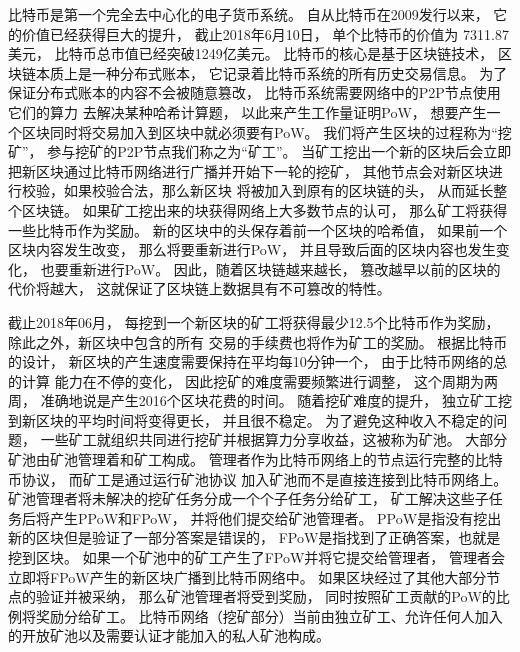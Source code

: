 \documentclass[a4paper, 11pt]{article}
\begin{document}
\begin{CJK*}{UTF8}{gbsn}
    比特币\cite{ref_article1}是第一个完全去中心化的电子货币系统。
    自从比特币在2009发行以来，
    它的价值已经获得巨大的提升，
    截止2018年6月10日，
    单个比特币的价值为
    7311.87美元，
    比特币总市值已经突破1249亿美元\cite{ref_web1}。
    比特币的核心是基于区块链技术，
    区块链本质上是一种分布式账本，
    它记录着比特币系统的所有历史交易信息。
    为了保证分布式账本的内容不会被随意篡改，
    比特币系统需要网络中的P2P节点使用它们的算力
    去解决某种哈希计算题，
    以此来产生工作量证明PoW，
    想要产生一个区块同时将交易加入到区块中就必须要有PoW。
    我们将产生区块的过程称为“挖矿”，
    参与挖矿的P2P节点我们称之为“矿工”。
    当矿工挖出一个新的区块后会立即把新区块通过比特币网络进行广播并开始下一轮的挖矿，
    其他节点会对新区块进行校验，如果校验合法，那么新区块
    将被加入到原有的区块链的头，
    从而延长整个区块链。
    如果矿工挖出来的块获得网络上大多数节点的认可，
    那么矿工将获得一些比特币作为奖励。
    新的区块中的头保存着前一个区块的哈希值，
    如果前一个区块内容发生改变，
    那么将要重新进行PoW，
    并且导致后面的区块内容也发生变化，
    也要重新进行PoW。
    因此，随着区块链越来越长，
    篡改越早以前的区块的代价将越大，
    这就保证了区块链上数据具有不可篡改的特性。


    截止2018年06月，
    每挖到一个新区块的矿工将获得最少12.5个比特币作为奖励，
    除此之外，新区块中包含的所有
    交易的手续费也将作为矿工的奖励。
    根据比特币的设计，
    新区块的产生速度需要保持在平均每10分钟一个，
    由于比特币网络的总的计算
    能力在不停的变化，
    因此挖矿的难度需要频繁进行调整，
    这个周期为两周，
    准确地说是产生2016个区块花费的时间。
    随着挖矿难度的提升，
    独立矿工挖到新区块的平均时间将变得更长，
    并且很不稳定。
    为了避免这种收入不稳定的问题，
    一些矿工就组织共同进行挖矿并根据算力分享收益，这被称为矿池。
    大部分矿池由矿池管理着和矿工构成。
    管理者作为比特币网络上的节点运行完整的比特币协议，
    而矿工是通过运行矿池协议\cite{ref_web2}
    加入矿池而不是直接连接到比特币网络上。
    矿池管理者将未解决的挖矿任务分成一个个子任务分给矿工，
    矿工解决这些子任务后将产生PPoW和FPoW，
    并将他们提交给矿池管理者。
    PPoW是指没有挖出新的区块但是验证了一部分答案是错误的，
    FPoW是指找到了正确答案，也就是挖到区块。
    如果一个矿池中的矿工产生了FPoW并将它提交给管理者，
    管理者会立即将FPoW产生的新区块广播到比特币网络中。
    如果区块经过了其他大部分节点的验证并被采纳，
    那么矿池管理者将受到奖励，
    同时按照矿工贡献的PoW的比例将奖励分给矿工。
    比特币网络（挖矿部分）当前由独立矿工、允许任何人加入的开放矿池以及需要认证才能加入的私人矿池构成。


\end{CJK*}
\end{document}
